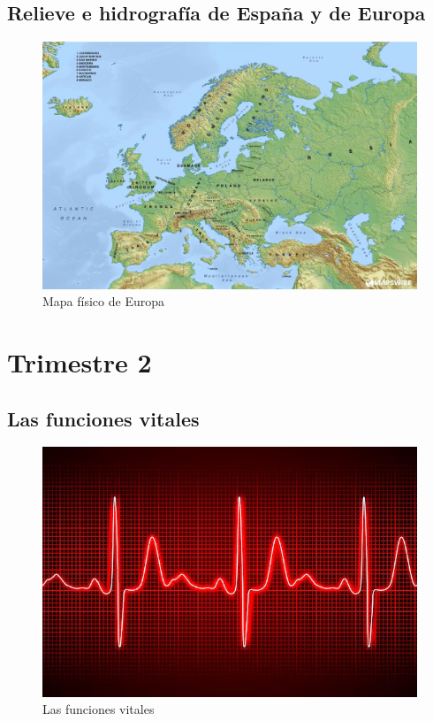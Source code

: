 \documentclass[12pt, a4paper]{book}
\begin{document}
\chapter{Relieve e hidrografía de España y de Europa}

\begin{figure}[ht]
    \centering
    \includegraphics[width=1\linewidth]{Tema2/01_mapa_europa_fisico.jpg}
    \caption{Mapa físico de Europa}
    \label{fig:mapa-fisico-europa}
\end{figure}











\part*{Trimestre 2}

\chapter{Las funciones vitales}

\begin{figure}[ht]
    \centering
    \includegraphics[width=1\linewidth]{Tema3/00_Vida.png}
    \caption{Las funciones vitales}
    \label{fig:funciones-vitales}
\end{figure}
\end{document}
